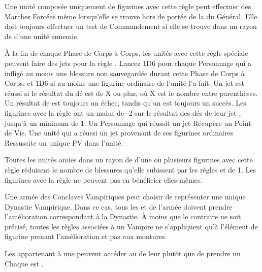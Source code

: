 
Une unité composée uniquement de figurines avec cette règle peut effectuer des Marches Forcées même lorsqu'elle se trouve hors de portée de la \inspiringpresence{} du Général. Elle doit toujours effectuer un test de Commandement si elle se trouve dans un rayon de  d'une unité ennemie.

À la fin de chaque Phase de Corps à Corps, les unités avec cette règle spéciale peuvent faire des jets pour la règle \vampiric{}. Lancez 1D6 pour chaque Personnage \vampiric{} qui a infligé au moins une blessure non sauvegardée durant cette Phase de Corps à Corps, et 1D6 si au moins une figurine ordinaire \vampiric{} de l'unité l'a fait. Un jet \vampiric{} est réussi si le résultat du dé est de X ou plus, où X est le nombre entre parenthèses. Un résultat de  est toujours un échec, tandis qu'un  est toujours un succès. Les figurines avec la règle \largetarget{} ont un malus de -2 sur le résultat des dés de leur jet \vampiric{}, jusqu'à un minimum de 1. Un Personnage qui réussit un jet \vampiric{} Récupère un Point de Vie. Une unité qui a réussi un jet \vampiric{} provenant de ses figurines ordinaires Ressuscite un unique PV dans l'unité.

\armyspecialruleentry{\necromanticaura}

Toutes les unités amies dans un rayon de  d'une ou plusieurs figurines avec cette règle réduisent le nombre de blessures qu'elle subissent par les règles \ashestoashes{} et \unstable{} de 1. Les figurines avec la règle \necromanticaura{} ne peuvent pas en bénéficier elles-mêmes.


\closearmyspecialrules



\spaceaftersection{}

Une armée des Conclaves Vampiriques peut choisir de représenter une unique Dynastie Vampirique. Dans ce cas, tous les \vampirelords{} et \vampireheroes{} de l'armée doivent prendre l'amélioration correspondant à la Dynastie. À moins que le contraire ne soit précisé, toutes les règles associées à un Vampire ne s'appliquent qu'à l'élément de figurine prenant l'amélioration et pas aux montures.


Les \vampirelords{} appartenant à une \bloodline{} peuvent accéder au \ancientbloodpower{} de leur \bloodline{} plutôt que de prendre un \bloodpower{}. Chaque \ancientbloodpower{} est \oneofakind{}.

